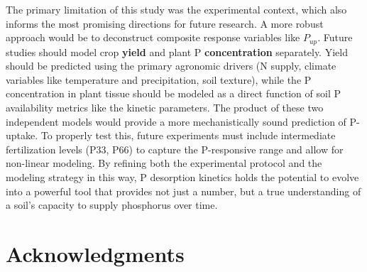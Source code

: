 \documentclass[
  a4paper,
]{article}
\begin{document}
The primary limitation of this study was the experimental context, which
also informs the most promising directions for future research. A more
robust approach would be to deconstruct composite response variables
like \(P_{up}\). Future studies should model crop \textbf{yield} and
plant P \textbf{concentration} separately. Yield should be predicted
using the primary agronomic drivers (N supply, climate variables like
temperature and precipitation, soil texture), while the P concentration
in plant tissue should be modeled as a direct function of soil P
availability metrics like the kinetic parameters. The product of these
two independent models would provide a more mechanistically sound
prediction of P-uptake. To properly test this, future experiments must
include intermediate fertilization levels (P33, P66) to capture the
P-responsive range and allow for non-linear modeling. By refining both
the experimental protocol and the modeling strategy in this way, P
desorption kinetics holds the potential to evolve into a powerful tool
that provides not just a number, but a true understanding of a soil's
capacity to supply phosphorus over time.

\newpage

\section{Acknowledgments}\label{acknowledgments}
\end{document}
